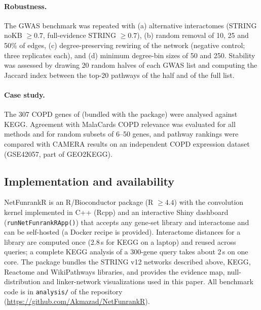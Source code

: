 \paragraph{Robustness.}\label{sec:robust}
The GWAS benchmark was repeated with (a) alternative interactomes (STRING noKB $\ge 0.7$, full-evidence STRING $\ge 0.7$), (b) random removal of 10, 25 and 50\% of edges, (c) degree-preserving rewiring of the network (negative control; three replicates each), and (d) minimum degree-bin sizes of 50 and 250. Stability was assessed by drawing 20 random halves of each GWAS list and computing the Jaccard index between the top-20 pathways of the half and of the full list.

\paragraph{Case study.}
The 307 COPD genes of \citet{MorselliGysi2021} (bundled with the package) were analysed against KEGG. Agreement with MalaCards COPD relevance was evaluated for all methods and for random subsets of 6--50 genes, and pathway rankings were compared with CAMERA results on an independent COPD expression dataset (GSE42057, part of GEO2KEGG).

\subsection{Implementation and availability}
NetFunrankR is an R/Bioconductor package (R $\ge 4.4$) with the convolution kernel implemented in C++ (Rcpp) and an interactive Shiny dashboard (\texttt{runNetFunrankRApp()}) that accepts any gene-set library and interactome and can be self-hosted (a Docker recipe is provided). Interactome distances for a library are computed once (2.8\,s for KEGG on a laptop) and reused across queries; a complete KEGG analysis of a 300-gene query takes about 2\,s on one core. The package bundles the STRING v12 networks described above, KEGG, Reactome and WikiPathways libraries, and provides the evidence map, null-distribution and linker-network visualizations used in this paper. All benchmark code is in \texttt{analysis/} of the repository (\url{https://github.com/Akmazad/NetFunrankR}).
